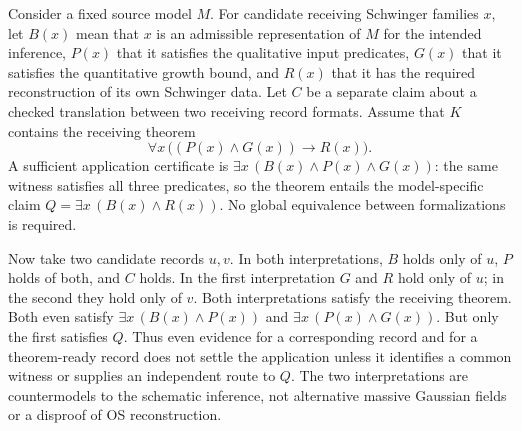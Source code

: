 \documentclass[pdflatex,sn-apa]{sn-jnl}
\begin{document}
Consider a fixed source model \(M\). For candidate receiving Schwinger families \(x\), let \(B(x)\) mean that \(x\) is an admissible representation of \(M\) for the intended inference, \(P(x)\) that it satisfies the qualitative input predicates, \(G(x)\) that it satisfies the quantitative growth bound, and \(R(x)\) that it has the required reconstruction of its own Schwinger data. Let \(C\) be a separate claim about a checked translation between two receiving record formats. Assume that \(K\) contains the receiving theorem
\[
\forall x\,\bigl((P(x)\land G(x))\to R(x)\bigr).
\]
A sufficient application certificate is \(\exists x\,(B(x)\land P(x)\land G(x))\): the same witness satisfies all three predicates, so the theorem entails the model-specific claim \(Q=\exists x\,(B(x)\land R(x))\). No global equivalence between formalizations is required.

Now take two candidate records \(u,v\). In both interpretations, \(B\) holds only of \(u\), \(P\) holds of both, and \(C\) holds. In the first interpretation \(G\) and \(R\) hold only of \(u\); in the second they hold only of \(v\). Both interpretations satisfy the receiving theorem. Both even satisfy \(\exists x\,(B(x)\land P(x))\) and \(\exists x\,(P(x)\land G(x))\). But only the first satisfies \(Q\). Thus even evidence for a corresponding record and for a theorem-ready record does not settle the application unless it identifies a common witness or supplies an independent route to \(Q\). The two interpretations are countermodels to the schematic inference, not alternative massive Gaussian fields or a disproof of OS reconstruction.
\end{document}
